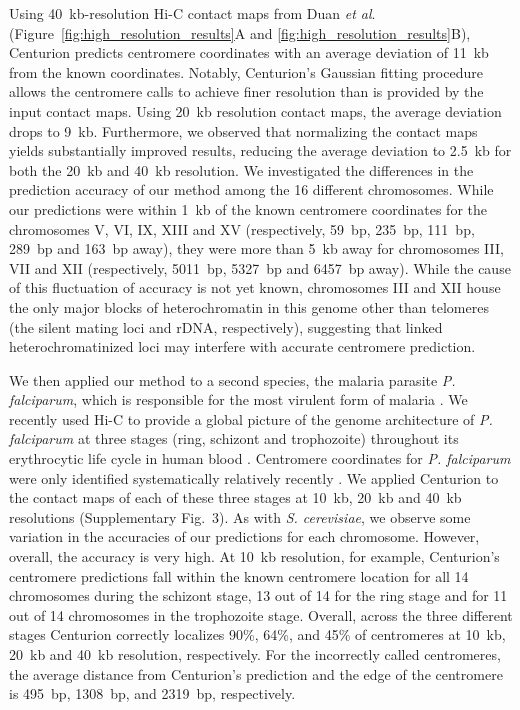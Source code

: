 Using 40~kb-resolution Hi-C contact maps from Duan
\textit{et al}.~\cite{duan:genome-wide}
(Figure~\ref{fig:high_resolution_results}A and
\ref{fig:high_resolution_results}B), Centurion predicts centromere
coordinates with an average deviation of 11~kb from the known coordinates.
Notably, Centurion's Gaussian fitting procedure allows the centromere calls to
achieve finer resolution than is provided by the input contact maps. Using
20~kb resolution contact maps, the average deviation drops to 9~kb.
Furthermore, we observed that normalizing the contact maps
\citep{imakaev:iterative} yields substantially improved results, reducing the
average deviation to 2.5~kb for both the 20~kb and 40~kb resolution. We
investigated the differences in the prediction accuracy of our method among
the 16 different chromosomes. While our predictions were within 1~kb of the
known centromere coordinates for the chromosomes V, VI, IX, XIII and XV
(respectively, 59~bp, 235~bp, 111~bp, 289~bp and 163~bp away), they were more
than 5~kb away for chromosomes III, VII and XII (respectively, 5011~bp, 5327~bp
and 6457~bp away).
While the cause of this fluctuation of accuracy is not yet known,
chromosomes III and XII house the only major blocks of heterochromatin
in this genome other than telomeres
 (the silent mating loci and rDNA,
respectively), suggesting that linked heterochromatinized loci may interfere
with accurate centromere prediction.

We then applied our method to a second species, the malaria parasite
\textit{P. falciparum}, which is responsible for the most virulent
form of malaria \citep{who:malaria}. We recently used Hi-C to provide a global
picture of the genome architecture of \textit{P. falciparum} at three stages
(ring, schizont and trophozoite) throughout its erythrocytic life cycle in
human blood \citep{ay:three-dimensional}. Centromere coordinates for
\textit{P. falciparum} were only identified systematically relatively recently
\citep{hoeijmakers:plasmodium}. We applied Centurion to the contact maps of
each of these three stages at 10~kb, 20~kb and 40~kb resolutions
(Supplementary Fig.~3).
As with \textit{S. cerevisiae}, we observe some
variation in the accuracies of our predictions for each chromosome. However,
overall, the accuracy is very high. At 10~kb resolution, for example,
Centurion's centromere predictions fall within the known centromere location
for all 14 chromosomes during the schizont stage, 13 out of 14 for the ring stage and for
11 out of 14 chromosomes in the trophozoite stage. Overall, across the three
different stages Centurion correctly localizes 90\%, 64\%, and 45\% of
centromeres at 10~kb, 20~kb and 40~kb resolution, respectively. For the
incorrectly called centromeres, the average distance from Centurion's
prediction and the edge of the centromere is 495~bp, 1308~bp, and 2319~bp,
respectively.

